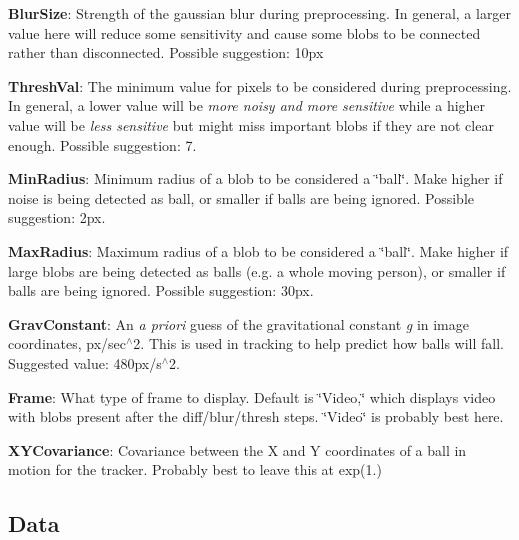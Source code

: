 \begin{DoxyItemize}
\item {\bfseries Blur\+Size}\+: Strength of the gaussian blur during preprocessing. In general, a larger value here will reduce some sensitivity and cause some blobs to be connected rather than disconnected. Possible suggestion\+: 10px
\item {\bfseries Thresh\+Val}\+: The minimum value for pixels to be considered during preprocessing. In general, a lower value will be {\itshape more noisy and more sensitive} while a higher value will be {\itshape less sensitive} but might miss important blobs if they are not clear enough. Possible suggestion\+: 7.
\item {\bfseries Min\+Radius}\+: Minimum radius of a blob to be considered a \char`\"{}ball\char`\"{}. Make higher if noise is being detected as ball, or smaller if balls are being ignored. Possible suggestion\+: 2px.
\item {\bfseries Max\+Radius}\+: Maximum radius of a blob to be considered a \char`\"{}ball\char`\"{}. Make higher if large blobs are being detected as balls (e.\+g. a whole moving person), or smaller if balls are being ignored. Possible suggestion\+: 30px.
\item {\bfseries Grav\+Constant}\+: An {\itshape a priori} guess of the gravitational constant {\itshape g} in image coordinates, px/sec$^\wedge$2. This is used in tracking to help predict how balls will fall. Suggested value\+: 480px/s$^\wedge$2.
\item {\bfseries Frame}\+: What type of frame to display. Default is \char`\"{}\+Video,\char`\"{} which displays video with blobs present after the diff/blur/thresh steps. \char`\"{}\+Video\char`\"{} is probably best here.
\item {\bfseries X\+Y\+Covariance}\+: Covariance between the X and Y coordinates of a ball in motion for the tracker. Probably best to leave this at exp(1.)
\end{DoxyItemize}

\subsection*{Data}


